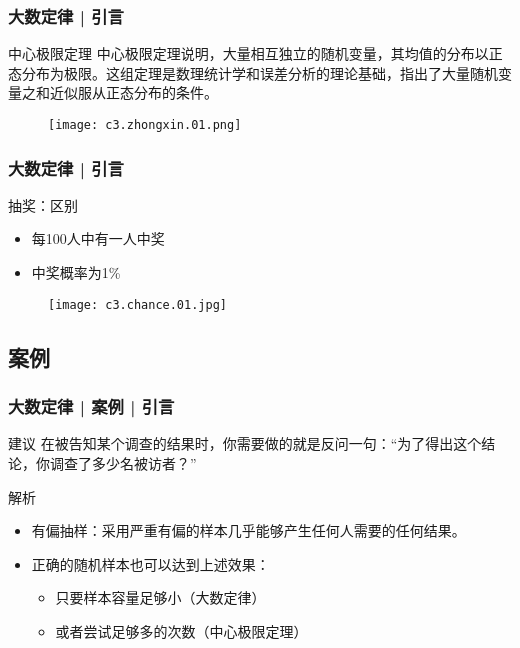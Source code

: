 \begin{frame}
  \frametitle{大数定律 | 引言}
  \begin{block}{中心极限定理}
中心极限定理说明，大量相互独立的随机变量，其均值的分布以正态分布为极限。这组定理是数理统计学和误差分析的理论基础，指出了大量随机变量之和近似服从正态分布的条件。
  \vspace{-1em}
  \begin{figure}
    \centering
    \texttt{[image: c3.zhongxin.01.png]}
  \end{figure}
  \end{block}
\end{frame}

\begin{frame}
  \frametitle{大数定律 | 引言}
  \begin{block}{抽奖：区别}
    \begin{itemize}
      \item 每100人中有一人中奖
      \item 中奖概率为1\%
    \end{itemize}
    \vspace{-1em}
    \begin{figure}
      \centering
      \texttt{[image: c3.chance.01.jpg]}
    \end{figure}
  \end{block}
\end{frame}

\subsection{案例}
\begin{frame}
  \frametitle{大数定律 | 案例 | 引言}
  \begin{block}{建议}
    在被告知某个调查的结果时，你需要做的就是反问一句：“为了得出这个结论，你调查了多少名被访者？”
  \end{block}
  \pause \pause \pause \pause
  \begin{block}{解析}
    \begin{itemize}
      \item 有偏抽样：采用严重有偏的样本几乎能够产生任何人需要的任何结果。
      \item 正确的随机样本也可以达到上述效果：
        \begin{itemize}
          \item 只要样本容量足够小（大数定律）
          \item 或者尝试足够多的次数（中心极限定理）
        \end{itemize}
    \end{itemize}
  \end{block}
\end{frame}

